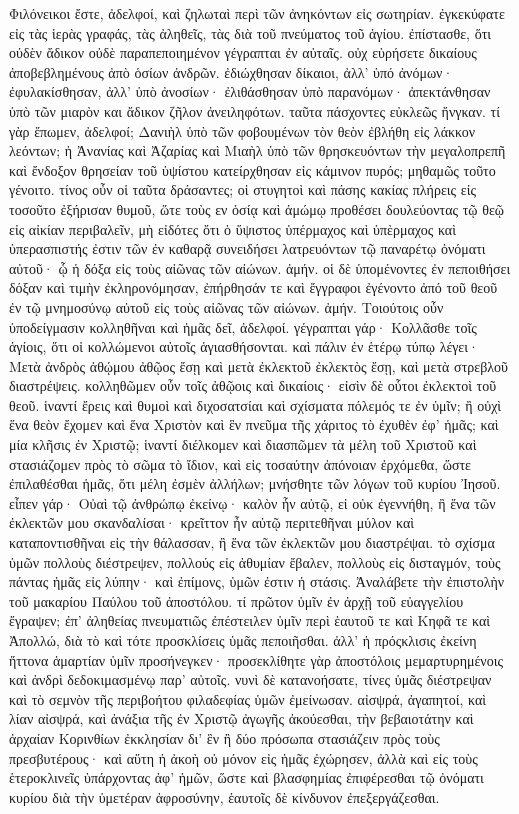 Φιλόνεικοι ἔστε, ἀδελφοί, καὶ ζηλωταὶ περὶ τῶν ἀνηκόντων εἰς σωτηρίαν. ἐγκεκύφατε εἰς τὰς ἱερὰς γραφάς, τὰς ἀληθεῖς, τὰς διὰ τοῦ πνεύματος τοῦ ἁγίου. ἐπίστασθε, ὅτι οὐδὲν ἄδικον οὐδὲ παραπεποιημένον γέγραπται ἐν αὐταῖς. οὐχ εὑρήσετε δικαίους ἀποβεβλημένους ἀπὸ ὁσίων ἀνδρῶν. ἐδιώχθησαν δίκαιοι, ἀλλ’ ὑπό ἀνόμων· ἐφυλακίσθησαν, ἀλλ’ ὑπὸ ἀνοσίων· ἐλιθάσθησαν ὑπὸ παρανόμων· ἀπεκτάνθησαν ὑπὸ τῶν μιαρὸν και ἄδικον ζῆλον ἀνειληφότων. ταῦτα πάσχοντες εὐκλεῶς ἤνγκαν. τί γὰρ ἔπωμεν, ἀδελφοί; Δανιὴλ ὑπὸ τῶν φοβουμένων τὸν θεὸν ἐβλήθη εἰς λάκκον λεόντων; ἡ Ἀνανίας καὶ Ἀζαρίας καὶ Μιαὴλ ὑπὸ τῶν θρησκευόντων τὴν μεγαλοπρεπῆ καὶ ἔνδοξον θρησείαν τοῦ ὑψίστου κατείρχθησαν εἰς κάμινον πυρός; μηθαμῶς τοῦτο γένοιτο. τίνος οὖν οἱ ταῦτα δράσαντες; οἱ στυγητοὶ καὶ πάσης κακίας πλήρεις εἰς τοσοῦτο ἐξήρισαν θυμοῦ, ὥτε τοὺς εν ὁσίᾳ καὶ ἀμώμῳ προθέσει δουλεύοντας τῷ θεῷ εἰς αἰκίαν περιβαλεῖν, μὴ εἰδότες ὅτι ὁ ὕψιστος ὑπέρμαχος καὶ ὑπὲρμαχος καὶ ὑπερασπιστής ἐστιν τῶν ἐν καθαρᾷ συνειδήσει λατρευόντων τῷ παναρέτῳ ὀνόματι αὐτοῦ· ᾧ ἡ δόξα εἰς τοὺς αἰῶνας τῶν αἰώνων. ἀμήν. οἱ δὲ ὑπομένοντες ἐν πεποιθήσει δόξαν καὶ τιμὴν ἐκληρονόμησαν, ἐπήρθησάν τε καὶ ἔγγραφοι ἐγένοντο ἀπό τοῦ θεοῦ ἐν τῷ μνημοσύνῳ αὐτοῦ εἰς τοὺς αἰῶνας τῶν αἰώνων. ἀμήν. 
Τοιούτοις οὖν ὑποδείγμασιν κολληθῆναι καὶ ἡμᾶς δεῖ, ἀδελφοί. γέγραπται γάρ· Κολλᾶσθε τοῖς ἁγίοις, ὅτι οἱ κολλώμενοι αὐτοῖς ἁγιασθήσονται. καὶ πάλιν ἐν ἑτέρῳ τύπῳ λέγει· Μετὰ ἀνδρὸς ἀθῴμου ἀθῷος ἔσῃ καὶ μετὰ ἐκλεκτοῦ ἐκλεκτὸς ἔσῃ, καὶ μετὰ στρεβλοῦ διαστρέψεις. κολληθῶμεν οὖν τοῖς ἀθῷοις καὶ δικαίοις· εἰσὶν δὲ οὗτοι ἐκλεκτοὶ τοῦ θεοῦ. ἱναντί ἔρεις καὶ θυμοὶ καὶ διχοσατσίαι καὶ σχίσματα πόλεμός τε ἐν ὑμῖν; ἢ οὐχὶ ἕνα θεὸν ἔχομεν καὶ ἕνα Χριστὸν καὶ ἓν πνεῦμα τῆς χάριτος τὸ ἐχυθὲν ἐφ’ ἡμᾶς; καὶ μία κλῆσις ἐν Χριστῷ; ἱναντί διέλκομεν καὶ διασπῶμεν τὰ μέλη τοῦ Χριστοῦ καὶ στασιάζομεν πρὸς τὸ σῶμα τὸ ἴδιον, καὶ εἰς τοσαύτην ἀπόνοιαν ἐρχόμεθα, ὥστε ἐπιλαθέσθαι ἡμᾶς, ὅτι μέλη ἐσμὲν ἀλλήλων; μνήσθητε τῶν λόγων τοῦ κυρίου Ἰησοῦ. εἶπεν γάρ· Οὐαὶ τῷ ἀνθρώπῳ ἐκείνῳ· καλὸν ἧν αὐτῷ, εἰ οὐκ ἐγεννήθη, ἢ ἕνα τῶν ἐκλεκτῶν μου σκανδαλίσαι· κρεῖττον ἦν αὐτῷ περιτεθῆναι μύλον καὶ καταποντισθῆναι εἰς τὴν θάλασσαν, ἢ ἕνα τῶν ἐκλεκτῶν μου διαστρέψαι. τὸ σχίσμα ὑμῶν πολλοὺς διέστρεψεν, πολλούς εἰς ἀθυμίαν ἔβαλεν, πολλοὺς εἰς δισταγμόν, τοὺς πάντας ἡμᾶς εἰς λύπην· καὶ ἐπίμονς, ὑμῶν ἐστιν ἡ στάσις.
Ἀναλάβετε τὴν ἐπιστολὴν τοῦ μακαρίου Παύλου τοῦ ἀποστόλου. τί πρῶτον ὑμῖν ἐν ἀρχῇ τοῦ εὐαγγελίου ἔγραψεν; ἐπ’ ἀληθείας πνευματιῶς ἐπέστειλεν ὑμῖν περὶ ἑαυτοῦ τε καὶ Κηφᾶ τε καὶ Ἀπολλώ, διὰ τὸ καὶ τότε προσκλίσεις ὑμᾶς πεποιῆσθαι. ἀλλ’ ἡ πρόςκλισις ἐκείνη ἥττονα ἁμαρτίαν ὑμῖν προσήνεγκεν· προσεκλίθητε γὰρ ἀποστόλοις μεμαρτυρημένοις καὶ ἀνδρὶ δεδοκιμασμένῳ παρ’ αὐτοῖς. νυνὶ δὲ κατανοήσατε, τίνες ὑμᾶς διέστρεψαν καὶ τὸ σεμνὸν τῆς περιβοήτου φιλαδεφίας ὑμῶν ἐμείνωσαν. αἰσψρά, ἀγαπητοί, καὶ λίαν αἰσψρά, καὶ ἀνάξια τῆς ἐν Χριστῷ ἀγωγῆς ἀκούεσθαι, τὴν βεβαιοτάτην καὶ ἀρχαίαν Κορινθίων ἐκκλησίαν δι’ ἓν ἢ δύο πρόσωπα στασιάζειν πρὸς τοὺς πρεσβυτέρους· καὶ αὕτη ἡ ἀκοὴ οὐ μόνον εἰς ἡμᾶς ἐχώρησεν, ἀλλὰ καὶ εἰς τοὺς ἑτεροκλινεῖς ὑπάρχοντας ἀφ’ ἡμῶν, ὥστε καὶ βλασφημίας ἐπιφέρεσθαι τῷ ὀνόματι κυρίου διὰ τὴν ὑμετέραν ἀφροσύνην, ἑαυτοῖς δὲ κίνδυνον ἐπεξεργάζεσθαι.

